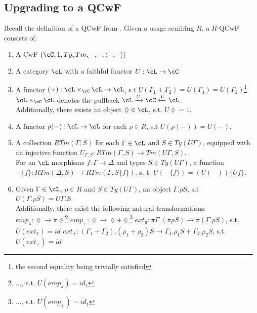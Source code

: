 \documentclass[12pt,a4paper]{article}
\begin{document}
\subsection*{Upgrading to a QCwF}
Recall the definition of a QCwF from \cite{Atkey2018}.
Given a usage semiring $R$, a $R$-QCwF consists of:
\begin{enumerate}[noitemsep]
  \item A CwF $(\cC, 1, Ty, Tm, -.-, \langle-.-\rangle)$
  
  \item A category $\cL$ with a faithful functor $U : \cL \to \cC$
  
  \item A functor $(+) : \cL \times_\cC \cL \to \cL$, s.t $U(\Gamma_1 + \Gamma_2) = U(\Gamma_1) = U(\Gamma_2)$\footnote{the second equality being trivially satisfied}. $\cL \times_\cC \cL$ denotes the pullback $\cL \xrightarrow{U} \cC \xleftarrow{U} \cL$.\\
  Additionally, there exists an object $\lozenge \in \cL$, s.t. $U\lozenge = 1$.
  
  \item A functor $\rho(-): \cL \to \cL$ for each $\rho \in R$, s.t $U(\rho(-)) = U(-)$.
  
  \item A collection $RTm(\Gamma, S)$ for each $\Gamma \in \cL$ and $S \in Ty(U\Gamma)$, equipped with an injective function $U_{\Gamma,S} : RTm(\Gamma, S) \to Tm(U\Gamma, S)$.\\
  For an $\cL$ morphisms $f: \Gamma \to \Delta$ and types $S \in Ty(U\Gamma)$, a function $-\{f\} : RTm(\Delta, S) \to RTm(\Gamma, S\{f\})$, s. t. $U(-\{f\}) = (U(-))\{Uf\}$.
         
  \item Given $\Gamma \in \cL$, $\rho \in R$ and $S \in Ty(U\Gamma)$, an object $\Gamma. \rho S$, s.t $U(\Gamma. \rho S) = U\Gamma.S$.\\
  Additionally, there exist the following natural transformations:
  \subitem $emp_\pi : \lozenge \to \pi\lozenge$\footnote{..., s.t. $U(emp_\pi)=id_1$ }
  \subitem $emp_+ : \lozenge \to \lozenge + \lozenge$\footnote{..., s.t. $U(emp_+)=id_1$ }
  \subitem $ext_\pi : \pi\Gamma. (\pi\rho S) \to \pi(\Gamma. \rho S)$, s.t. $U(ext_\pi) = id$ 
  \subitem $ext_+ : (\Gamma_1 + \Gamma_2).(\rho_1 + \rho_2)S \to \Gamma_1.\rho_1 S + \Gamma_2 . \rho_2 S$, s.t.  $U(ext_+) = id$ 
  

\end{enumerate}
\end{document}
